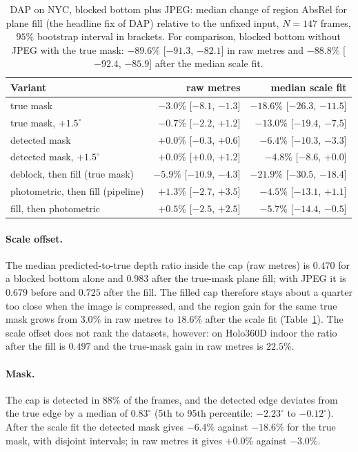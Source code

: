 \documentclass{article}
\newcommand{\absrel}{AbsRel}
\begin{document}
\begin{table}[!htbp]\centering\small
\caption{DAP on NYC, blocked bottom plus JPEG: median change of region \absrel{} for plane fill (the headline fix of DAP) relative to the unfixed input, $N=147$ frames, $95\%$ bootstrap interval in brackets. For comparison, blocked bottom without JPEG with the true mask: $-89.6\%$ [$-91.3$, $-82.1$] in raw metres and $-88.8\%$ [$-92.4$, $-85.9$] after the median scale fit.}\label{tab:diag}
\begin{tabular}{lrr}\toprule
Variant & raw metres & median scale fit\\\midrule
true mask & $-3.0\%$ [$-8.1$, $-1.3$] & $-18.6\%$ [$-26.3$, $-11.5$]\\
true mask, $+1.5^\circ$ & $-0.7\%$ [$-2.2$, $+1.2$] & $-13.0\%$ [$-19.4$, $-7.5$]\\
detected mask & $+0.0\%$ [$-0.3$, $+0.6$] & $-6.4\%$ [$-10.3$, $-3.3$]\\
detected mask, $+1.5^\circ$ & $+0.0\%$ [$+0.0$, $+1.2$] & $-4.8\%$ [$-8.6$, $+0.0$]\\
deblock, then fill (true mask) & $-5.9\%$ [$-10.9$, $-4.3$] & $-21.9\%$ [$-30.5$, $-18.4$]\\
photometric, then fill (pipeline) & $+1.3\%$ [$-2.7$, $+3.5$] & $-4.5\%$ [$-13.1$, $+1.1$]\\
fill, then photometric & $+0.5\%$ [$-2.5$, $+2.5$] & $-5.7\%$ [$-14.4$, $-0.5$]\\
\bottomrule\end{tabular}
\end{table}

\paragraph{Scale offset.} The median predicted-to-true depth ratio inside the cap (raw metres) is $0.470$ for a blocked bottom alone and $0.983$ after the true-mask plane fill; with JPEG it is $0.679$ before and $0.725$ after the fill. The filled cap therefore stays about a quarter too close when the image is compressed, and the region gain for the same true mask grows from $3.0\%$ in raw metres to $18.6\%$ after the scale fit (Table~\ref{tab:diag}). The scale offset does not rank the datasets, however: on Holo360D indoor the ratio after the fill is $0.497$ and the true-mask gain in raw metres is $22.5\%$.

\paragraph{Mask.} The cap is detected in $88\%$ of the frames, and the detected edge deviates from the true edge by a median of $0.83^\circ$ (5th to 95th percentile: $-2.23^\circ$ to $-0.12^\circ$). After the scale fit the detected mask gives $-6.4\%$ against $-18.6\%$ for the true mask, with disjoint intervals; in raw metres it gives $+0.0\%$ against $-3.0\%$.
\end{document}
